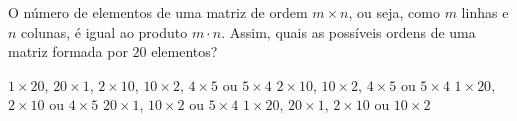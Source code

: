 O número de elementos de uma matriz de ordem $m\times n$, ou seja, como $m$ linhas e $n$ colunas, é igual ao produto $m\cdot n$. Assim, quais as possíveis ordens de uma matriz formada por $20$ elementos?

$1\times 20$, $20\times 1$, $2\times 10$, $10\times 2$, $4\times 5$ ou $5\times 4$
$2\times 10$, $10\times 2$, $4\times 5$ ou $5\times 4$
$1\times 20$, $2\times 10$ ou $4\times 5$
$20\times 1$, $10\times 2$ ou $5\times 4$
$1\times 20$, $20\times 1$, $2\times 10$ ou $10\times 2$


